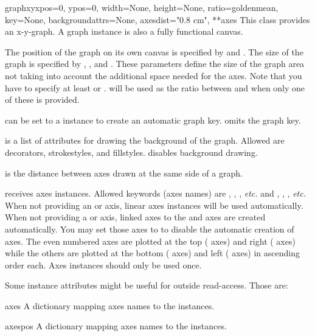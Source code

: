 \begin{classdesc}{graphxy}{xpos=0, ypos=0, width=None, height=None,
ratio=goldenmean, key=None, backgroundattrs=None, axesdist="0.8 cm",
**axes}
  This class provides an x-y-graph. A graph instance is also a fully
  functional canvas.

  The position of the graph on its own canvas is specified by
   and . The size of the graph is specified by
  , , and . These parameters define
  the size of the graph area not taking into account the additional
  space needed for the axes. Note that you have to specify at least
   or .  will be used as the ratio
  between  and  when only one of these is
  provided.

   can be set to a  instance to create
  an automatic graph key.  omits the graph key.

   is a list of attributes for drawing the
  background of the graph. Allowed are decorators, strokestyles, and
  fillstyles.  disables background drawing.

   is the distance between axes drawn at the same side
  of a graph.

   receives axes instances. Allowed keywords (axes names)
  are , , , \emph{etc.} and ,
  , , \emph{etc.} When not providing an  or
   axis, linear axes instances will be used automatically.
  When not providing a  or  axis, linked axes to the
   and  axes are created automatically. You may set
  those axes to  to disable the automatic creation of axes.
  The even numbered axes are plotted at the top ( axes) and
  right ( axes) while the others are plotted at the bottom
  ( axes) and left ( axes) in ascending order each.
  Axes instances should only be used once.
\end{classdesc}

Some instance attributes might be useful for outside read-access.
Those are:

\begin{memberdesc}{axes}
  A dictionary mapping axes names to the  instances.
\end{memberdesc}

\begin{memberdesc}{axespos}
  A dictionary mapping axes names to the  instances.
\end{memberdesc}


